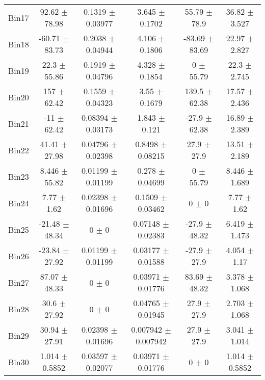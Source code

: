 \begin{tabular}{@{\extracolsep{4pt}}lccccc@{}}
     Bin17 & 92.62 $\pm$ 78.98 & 0.1319 $\pm$ 0.03977 & 3.645 $\pm$ 0.1702 & 55.79 $\pm$ 78.9 & 36.82 $\pm$ 3.527 \\ 
     Bin18 & -60.71 $\pm$ 83.73 & 0.2038 $\pm$ 0.04944 & 4.106 $\pm$ 0.1806 & -83.69 $\pm$ 83.69 & 22.97 $\pm$ 2.827 \\ 
     Bin19 & 22.3 $\pm$ 55.86 & 0.1919 $\pm$ 0.04796 & 4.328 $\pm$ 0.1854 & 0 $\pm$ 55.79 & 22.3 $\pm$ 2.745 \\ 
     Bin20 & 157 $\pm$ 62.42 & 0.1559 $\pm$ 0.04323 & 3.55 $\pm$ 0.1679 & 139.5 $\pm$ 62.38 & 17.57 $\pm$ 2.436 \\ 
     Bin21 & -11 $\pm$ 62.42 & 0.08394 $\pm$ 0.03173 & 1.843 $\pm$ 0.121 & -27.9 $\pm$ 62.38 & 16.89 $\pm$ 2.389 \\ 
     Bin22 & 41.41 $\pm$ 27.98 & 0.04796 $\pm$ 0.02398 & 0.8498 $\pm$ 0.08215 & 27.9 $\pm$ 27.9 & 13.51 $\pm$ 2.189 \\ 
     Bin23 & 8.446 $\pm$ 55.82 & 0.01199 $\pm$ 0.01199 & 0.278 $\pm$ 0.04699 & 0 $\pm$ 55.79 & 8.446 $\pm$ 1.689 \\ 
     Bin24 & 7.77 $\pm$ 1.62 & 0.02398 $\pm$ 0.01696 & 0.1509 $\pm$ 0.03462 & 0 $\pm$ 0 & 7.77 $\pm$ 1.62 \\ 
     Bin25 & -21.48 $\pm$ 48.34 & 0 $\pm$ 0 & 0.07148 $\pm$ 0.02383 & -27.9 $\pm$ 48.32 & 6.419 $\pm$ 1.473 \\ 
     Bin26 & -23.84 $\pm$ 27.92 & 0.01199 $\pm$ 0.01199 & 0.03177 $\pm$ 0.01588 & -27.9 $\pm$ 27.9 & 4.054 $\pm$ 1.17 \\ 
     Bin27 & 87.07 $\pm$ 48.33 & 0 $\pm$ 0 & 0.03971 $\pm$ 0.01776 & 83.69 $\pm$ 48.32 & 3.378 $\pm$ 1.068 \\ 
     Bin28 & 30.6 $\pm$ 27.92 & 0 $\pm$ 0 & 0.04765 $\pm$ 0.01945 & 27.9 $\pm$ 27.9 & 2.703 $\pm$ 1.068 \\ 
     Bin29 & 30.94 $\pm$ 27.91 & 0.02398 $\pm$ 0.01696 & 0.007942 $\pm$ 0.007942 & 27.9 $\pm$ 27.9 & 3.041 $\pm$ 1.014 \\ 
     Bin30 & 1.014 $\pm$ 0.5852 & 0.03597 $\pm$ 0.02077 & 0.03971 $\pm$ 0.01776 & 0 $\pm$ 0 & 1.014 $\pm$ 0.5852 \\ 
\hline\hline
  \end{tabular}
